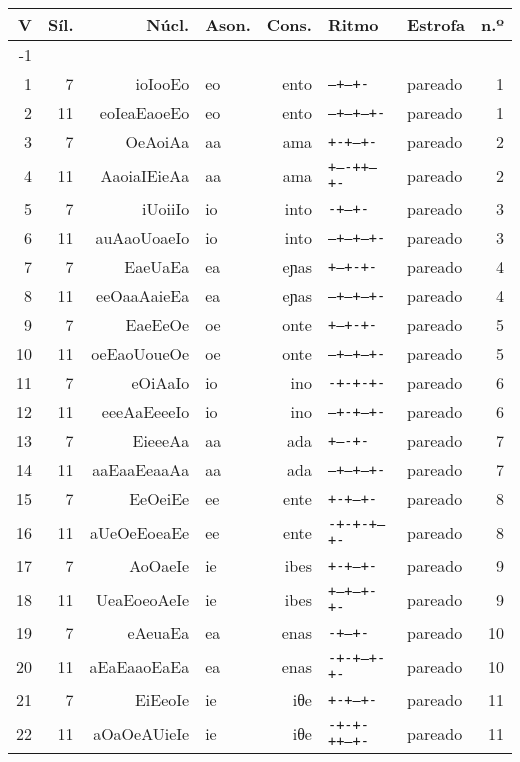 \begin{table}[!ht]
	\centering\scriptsize
\begin{tabular}{rrrlrllr}
\toprule
\textbf{V} &\textbf{Síl.} & \textbf{Núcl.} & \textbf{Ason.} & \textbf{Cons.} & \textbf{Ritmo} & \textbf{Estrofa} & \textbf{n.º}\\
\midrule
-1 &&&&&&&\\
1 & 7 & ioIooEo & eo & ento &\texttt{--+---+-} &pareado&1\\
2 & 11 &eoIeaEaoeEo & eo & ento &\texttt{--+--+---+-} &pareado&1\\
3 & 7 &OeAoiAa & aa & ama &\texttt{+-+--+-} &pareado&2\\
4 & 11 &AaoiaIEieAa & aa & ama &\texttt{+----++--+-} &pareado&2\\
5 & 7 &iUoiiIo & io & into &\texttt{-+---+-} &pareado&3\\
6 & 11 &auAaoUoaeIo & io & into &\texttt{--+--+---+-} &pareado&3\\
7 & 7 &EaeUaEa & ea & eɲas &\texttt{+--+-+-} &pareado&4\\
8 & 11 &eeOaaAaieEa & ea & eɲas &\texttt{--+--+---+-} &pareado&4\\
9 & 7 &EaeEeOe & oe & onte &\texttt{+--+-+-} &pareado&5\\
10  & 11 &oeEaoUoueOe & oe & onte &\texttt{--+--+---+-} &pareado&5\\
11  & 7 &eOiAaIo & io & ino &\texttt{-+-+-+-} &pareado&6\\
12 & 11 &eeeAaEeeeIo & io & ino &\texttt{---+-+---+-} &pareado&6\\
13 & 7 &EieeeAa & aa & ada &\texttt{+----+-} &pareado&7\\
14 & 11 &aaEaaEeaaAa & aa & ada &\texttt{--+--+---+-} &pareado&7\\
15 & 7 &EeOeiEe & ee & ente &\texttt{+-+--+-} &pareado&8\\
16 & 11 &aUeOeEoeaEe & ee & ente &\texttt{-+-+-+---+-} &pareado&8\\
17 & 7 &AoOaeIe & ie & ibes &\texttt{+-+--+-} &pareado&9\\
18 & 11 &UeaEoeoAeIe & ie & ibes &\texttt{+--+---+-+-} &pareado&9\\
19 & 7 &eAeuaEa & ea & enas &\texttt{-+---+-} &pareado&10\\
20 & 11 &aEaEaaoEaEa & ea & enas &\texttt{-+-+---+-+-} &pareado&10\\
21 & 7 &EiEeoIe & ie & iθe &\texttt{+-+--+-} &pareado&11\\
22 & 11 &aOaOeAUieIe & ie & iθe &\texttt{-+-+-++--+-} &pareado&11\\

\end{tabular}
\end{table}
